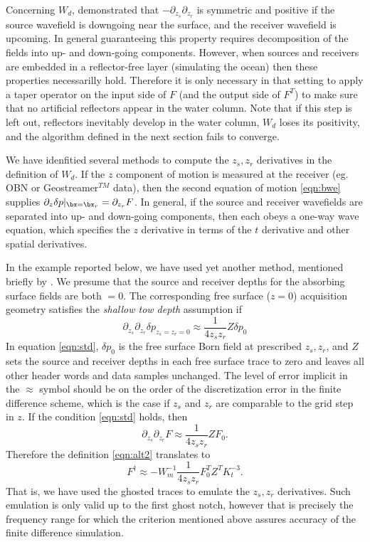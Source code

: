 Concerning $W_d$, \cite{HouSymes:15} demonstrated
that $-\partial_{z_s}\partial_{z_r}$ is symmetric and
positive if the source wavefield is downgoing near the surface, and
the receiver wavefield is upcoming. In general guaranteeing this
property requires decomposition of the fields into up- and down-going
components. However, when sources and receivers are embedded in a
reflector-free layer (simulating the ocean) then these properties
necessarilly hold. Therefore it is only necessary in that setting to
apply a taper operator on the input side of $F$ (and the output side
of $F^T$) to make sure that no artificial reflectors
appear in the water column. Note that if this step is left
out, reflectors inevitably develop in the water column, $W_d$ loses
its positivity, and the algorithm defined in the next section fails to
converge.

We have idenfitied several methods to compute the $z_s, z_r$ derivatives in the definition of $W_d$. If the $z$ component of motion is measured at the receiver (eg. OBN or
Geostreamer$^{TM}$ data), then the second equation of motion
\ref{eqn:bwe} supplies $\partial_{z}\delta p|_{\bx=\bx_r}
= \partial_{z_r}F$. In general, if the source and receiver wavefields
are separated into up- and down-going components, then each obeys a
one-way wave equation, which specifies the $z$ derivative in terms of
the $t$ derivative and other spatial derivatives.

In the example reported below, we have used yet another method,
mentioned briefly by \cite{HouSymes:15}. We
presume that the source and receiver depths for the absorbing surface
fields are both $=0$. The corresponding free surface ($z=0$) acquisition geometry satisfies the {\em shallow tow depth}
assumption if
\begin{equation}
\label{eqn:std}
\partial_{z_s}\partial_{z_r} \delta p_{z_s = z_r=0} \approx
\frac{1}{4z_sz_r}Z\delta p_0
\end{equation}
In equation \ref{eqn:std}, $\delta p_0$ is the free surface Born field at prescribed $z_s, z_r$, and $Z$ sets the source and receiver depths in
each free surface trace to zero and leaves all other header words and
data samples unchanged. The level of error implicit in the $\approx$
symbol should be on the order of the discretization error in the finite
difference scheme, which is the case if $z_s$ and $z_r$ are comparable
to the grid step in $z$. If the condition \ref{eqn:std} holds, then 
\begin{equation}
\label{eqn:stdop}
\partial_{z_s}\partial_{z_r} F \approx \frac{1}{4z_sz_r}Z F_0.
\end{equation}
Therefore the definition \ref{eqn:alt2} translates to
\begin{equation}
\label{eqn:appinvab}
F^{\dagger} \approx - W_m^{-1} \frac{1}{4z_sz_r}F_0^TZ^TK_t^{-3}.
\end{equation}
That is, we have used the ghosted traces to emulate the $z_s,z_r$
derivatives. Such emulation is only valid up to the first ghost notch,
however that is precisely the frequency range for which the criterion
mentioned above assures accuracy of the finite difference simulation.

